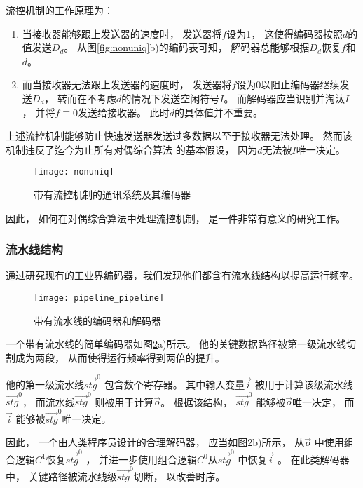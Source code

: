流控机制的工作原理为：
\begin{enumerate}
\item
当接收器能够跟上发送器的速度时，
发送器将$f$设为1，
这使得编码器按照$d$的值发送$D_d$。
从图\ref{fig:nonuniq}b)的编码表可知，
解码器总能够根据$D_d$恢复$f$和$d$。
\item
而当接收器无法跟上发送器的速度时，
发送器将$f$设为0以阻止编码器继续发送$D_d$，
转而在不考虑$d$的情况下发送空闲符号$I$。
而解码器应当识别并淘汰$I$，
并将$f\equiv 0$发送给接收器。
此时$d$的具体值并不重要。
\end{enumerate}

上述流控机制能够防止快速发送器发送过多数据以至于接收器无法处理。
然而该机制违反了迄今为止所有对偶综合算法
的基本假设，
因为$d$无法被$I$唯一决定。


\begin{figure}
\centerline{\texttt{[image: nonuniq]}}
\caption{带有流控机制的通讯系统及其编码器}
\label{fig_nonuniq_chap1}
\end{figure}

因此，
如何在对偶综合算法中处理流控机制，
是一件非常有意义的研究工作。

\subsubsection{流水线结构}

通过研究现有的工业界编码器，我们发现他们都含有流水线结构以提高运行频率。
\begin{figure}[b]
\begin{center}
\texttt{[image: pipeline\_pipeline]}
\end{center}
\caption{带有流水线的编码器和解码器}
  \label{fig_pipe_chap1}
\end{figure}

一个带有流水线的简单编码器如图\ref{fig_pipe_chap1}a)所示。
他的关键数据路径被第一级流水线切割成为两段，
从而使得运行频率得到两倍的提升。

他的第一级流水线$\vec{stg}^0$ 包含数个寄存器。
其中输入变量$\vec{i}$ 被用于计算该级流水线$\vec{stg}^0$，
而流水线$\vec{stg}^0$ 则被用于计算$\vec{o}$。
根据该结构，
$\vec{stg}^0$ 能够被$\vec{o}$唯一决定，
而$\vec{i}$ 能够被$\vec{stg}^0$唯一决定。

因此，
一个由人类程序员设计的合理解码器，
应当如图\ref{fig_pipe_chap1}b)所示，
从$\vec{o}$ 中使用组合逻辑$C^1$恢复$\vec{stg}^0$ ，
并进一步使用组合逻辑$C^0$从$\vec{stg}^0$ 中恢复$\vec{i}$ 。
在此类解码器中，
关键路径被流水线级$\vec{stg}^0$切断，
以改善时序。

